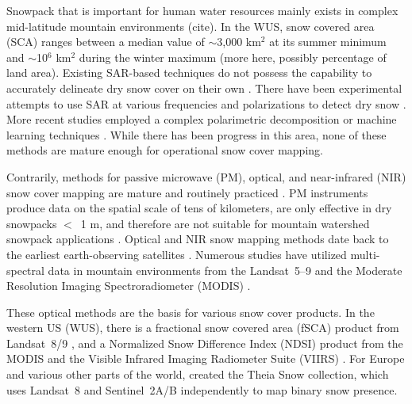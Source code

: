 Snowpack that is important for human water resources mainly exists in complex mid-latitude mountain environments (cite). In the WUS, snow covered area (SCA) ranges between a median value of $\sim$3,000 km$^{2}$ at its summer minimum and $\sim$10$^{6}$ km$^{2}$ during the winter maximum \citep{rittgerSnowToday2022} (more here, possibly percentage of land area). Existing SAR-based techniques do not possess the capability to accurately delineate dry snow cover on their own \citep{tsaiRemoteSensingSnow2019}. There have been experimental attempts to use SAR at various frequencies and polarizations to detect dry snow \citep{rottThematicStudiesAlpine1994, shiMappingSeasonalSnow1997}. More recent studies employed a complex polarimetric decomposition \cite{varadeIdentificationSnowUsing2020} or machine learning techniques \cite{tsaiWetDrySnow2019}. While there has been progress in this area, none of these methods are mature enough for operational snow cover mapping. \par

Contrarily, methods for passive microwave (PM), optical, and near-infrared (NIR) snow cover mapping are mature and routinely practiced \citep{dozierMultispectralHyperspectralRemote2004,saberiReviewSnowWater2020}. PM instruments produce data on the spatial scale of tens of kilometers, are only effective in dry snowpacks $<$~1 m, and therefore are not suitable for mountain watershed snowpack applications \citep{takalaEstimatingNorthernHemisphere2011a,pulliainenPatternsTrendsNorthern2020}. Optical and NIR snow mapping methods date back to the earliest earth-observing satellites \citep{rangoSatellitePotentialsSnowcover1976a}. Numerous studies have utilized multi-spectral data in mountain environments from the Landsat~5--9 \citep{dozierSpectralSignatureAlpine1989} and the Moderate Resolution Imaging Spectroradiometer (MODIS) \citep{painterRetrievalSubpixelSnowcovered2003, painterRetrievalSubpixelSnow2009, rittgerAssessmentMethodsMapping2013}. 

These optical methods are the basis for various snow cover products. In the western US (WUS), there is a fractional snow covered area (fSCA) product from Landsat~8/9 \citep{selkowitzUSGSLandsatSnow2017}, and a Normalized Snow Difference Index (NDSI) \citep{dozierSpectralSignatureAlpine1989, hallDevelopmentMethodsMapping1995} product from the MODIS \citep{hallMODISSnowcoverProducts2002} and the Visible Infrared Imaging Radiometer Suite (VIIRS) \citep{justiceLandCryosphereProducts2013}. For Europe and various other parts of the world, \cite{gascoinTheiaSnowCollection2019a} created the Theia Snow collection, which uses Landsat~8 and Sentinel~2A/B independently to map binary snow presence.

